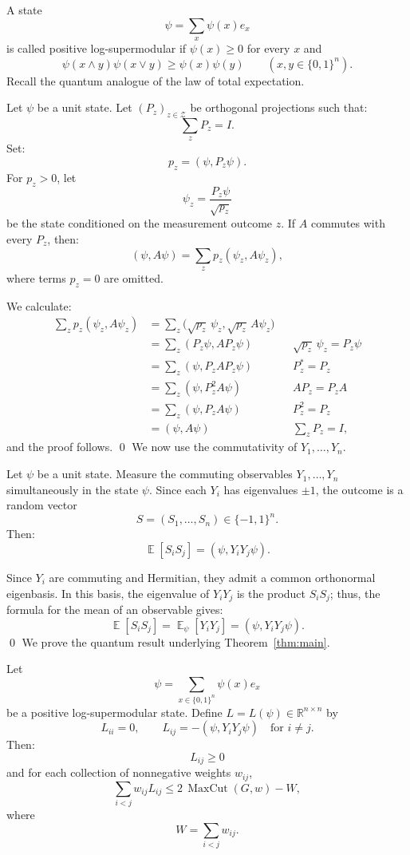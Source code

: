 \documentclass[12pt,reqno]{amsart}
\makeatletter
\renewenvironment{proof}[1][\proofname]{%
  \par\vspace{\topsep}%
  \normalfont\topsep6\p@\@plus6\p@\relax
  \trivlist
  \item[\hskip\labelsep\itshape #1\@addpunct{.}]\ignorespaces
}{%
  \endtrivlist
}
\numberwithin{equation}{section}
\DeclareMathOperator{\E}{\mathbb{E}}
\makeatother
\begin{document}
A state 
\[ 
\psi=\sum_x\psi(x)e_x 
\] 
is called positive log-supermodular if \(\psi(x)\ge0\) for every \(x\) and 
\[ 
\psi(x\wedge y)\psi(x\vee y) \ge \psi(x)\psi(y) \qquad (x,y\in\{0,1\}^n). 
\]
Recall the quantum analogue of the law of total
expectation.
\begin{lemma}\label{total}
Let \(\psi\) be a unit state. 
Let \((P_z)_{z \in \mathcal Z}\) be
orthogonal projections such that:
\[
\sum_zP_z=I.
\]
Set:
\[
p_z=(\psi,P_z\psi).
\]
For \(p_z>0\), let
\[
\psi_z=\frac{P_z\psi}{\sqrt{p_z}}
\]
be the state conditioned on the measurement outcome \(z\).
If \(A\) commutes with every \(P_z\), then:
\[
(\psi,A\psi)
=
\sum_{z}
p_z(\psi_z,A\psi_z),
\]
where terms \(p_z=0\) are omitted.
\end{lemma}
\begin{proof}
We calculate:
\begin{align*}
\sum_z p_z(\psi_z,A\psi_z)
&=
\sum_z
\bigl(\sqrt{p_z}\,\psi_z,
      \sqrt{p_z}\,A\psi_z\bigr)
&& 
\\
&=
\sum_z
(P_z\psi,AP_z\psi)
&& \text{\(\sqrt{p_z}\,\psi_z=P_z\psi\)}
\\
&=
\sum_z
(\psi,P_zAP_z\psi)
&& \text{\(P_z^*=P_z\)}
\\
&=
\sum_z
(\psi,P_z^2A\psi)
&& \text{\(AP_z=P_zA\)}
\\
&=
\sum_z
(\psi,P_zA\psi)
&& \text{\(P_z^2=P_z\)}
\\
&=
(\psi,A\psi)
&& \text{\(\sum_zP_z=I\),}
\end{align*}
and the proof follows. \qed
\end{proof}
We now use the commutativity of \(Y_1,\ldots,Y_n\).
\begin{lemma}\label{joint}
Let \(\psi\) be a unit state. Measure the commuting observables \(Y_1,\ldots,Y_n\) simultaneously in the state \(\psi\). Since each \(Y_i\) has eigenvalues \(\pm1\), 
the outcome is a random vector
\[
S=(S_1,\ldots,S_n)\in\{-1,1\}^n.
\]
Then:
\[
\E[S_iS_j]
=
(\psi,Y_iY_j\psi).
\]
\end{lemma}
\begin{proof}
Since \(Y_i\) are commuting and Hermitian,
they admit a common orthonormal eigenbasis. 
In this basis, the eigenvalue of \(Y_iY_j\)
is the product \(S_iS_j\); thus, the formula for 
the mean of an observable gives:
\[
\E[S_iS_j]
=
\E_\psi[Y_iY_j]
=
(\psi,Y_iY_j\psi).
\]
\qed
\end{proof}
We prove the quantum result underlying
Theorem~\ref{thm:main}.
\begin{theorem}\label{thm:quantum}
Let
\[
\psi
=
\sum_{x\in\{0,1\}^n}
\psi(x)e_x
\]
be a positive log-supermodular state. Define \(L=L(\psi)\in\mathbb R^{n\times n}\) by
\[
L_{ii}=0,
\qquad
L_{ij}=-(\psi,Y_iY_j\psi)
\quad \text{for \(i \neq j\)}.
\]
Then:
\[
L_{ij} \ge 0
\]
and for each collection of nonnegative weights \(w_{ij}\),
\[
\sum_{i<j}w_{ij}L_{ij}
\le
2\,\operatorname{MaxCut}(G,w)-W,
\]
where
\[
W=\sum_{i<j}w_{ij}.
\]
\end{theorem}
\end{document}
